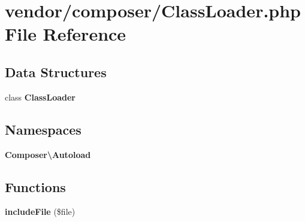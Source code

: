 \section{vendor/composer/\+Class\+Loader.php File Reference}
\label{composer_2_class_loader_8php}
\subsection*{Data Structures}
\begin{DoxyCompactItemize}
\item 
class {\bf Class\+Loader}
\end{DoxyCompactItemize}
\subsection*{Namespaces}
\begin{DoxyCompactItemize}
\item 
 {\bf Composer\textbackslash{}\+Autoload}
\end{DoxyCompactItemize}
\subsection*{Functions}
\begin{DoxyCompactItemize}
\item 
{\bf include\+File} (\$file)
\end{DoxyCompactItemize}
